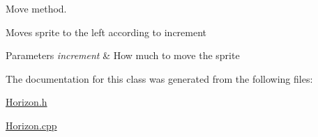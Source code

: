 Move method. 

Moves sprite to the left according to increment 
\begin{DoxyParams}{Parameters}
{\em increment} & How much to move the sprite \\
\hline
\end{DoxyParams}


The documentation for this class was generated from the following files\+:\begin{DoxyCompactItemize}
\item 
\mbox{\hyperlink{_horizon_8h}{Horizon.\+h}}\item 
\mbox{\hyperlink{_horizon_8cpp}{Horizon.\+cpp}}\end{DoxyCompactItemize}
